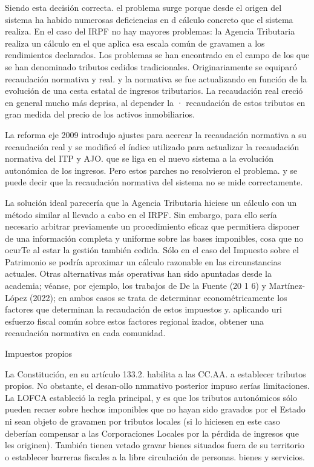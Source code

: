 \documentclass[10pt,a4paper]{article}
\begin{document}
{Siendo esta decisión correcta. el problema surge porque desde el origen del sistema ha habido numerosas deficiencias en d cálculo concreto que el sistema realiza. En el caso del IRPF no hay mayores problemas: la Agencia Tributaria realiza un cálculo en el que aplica esa escala común de gravamen a los rendimientos declarados. Los problemas se han encontrado en el campo de los que se han denominado tributos cedidos tradicionales. Originariamente se equiparó recaudación normativa y real. y la normativa se fue actualizando en función de la evolución de una cesta estatal de ingresos tributarios. La recaudación real creció en general mucho más deprisa, al depender la · recaudación de estos tributos en gran medida del precio de los activos inmobiliarios.

La reforma eje 2009 introdujo ajustes para acercar la recaudación normativa a su recaudación real y se modificó el índice utilizado para actualizar la recaudación normativa del ITP y AJO. que se liga en el nuevo sistema a la evolución autonómica de los ingresos. Pero estos parches no resolvieron el problema. y se puede decir que la recaudación normativa del sistema no se mide correctamente.

La solución ideal parecería que la Agencia Tributaria hiciese un cálculo con un método similar al llevado a cabo en el IRPF. Sin embargo, para ello sería necesario arbitrar previamente un procedimiento eficaz que permitiera disponer de una información completa y uniforme sobre las bases imponibles, cosa que no ocurTe al estar la gestión también cedida. Sólo en el caso del Impuesto sobre el Patrimonio se podría aproximar un cálculo razonable en las circunstancias actuales. Otras alternativas más operativas han sido apuntadas desde la academia; véanse, por ejemplo, los trabajos de De la Fuente (20 1 6) y Martínez-López (2022); en ambos casos se trata de determinar econométricamente los factores que determinan la recaudación de estos impuestos y. aplicando uri esfuerzo fiscal común sobre estos factores regional izados, obtener una recaudación normativa en cada comunidad.

Impuestos propios

La Constitución, en su artículo 133.2. habilita a las CC.AA. a establecer tributos propios. No obstante, el desan-ollo nmmativo posterior impuso serías limitaciones. La LOFCA estableció la regla principal, y es que los tributos autonómicos sólo pueden recaer sobre hechos imponibles que no hayan sido gravados por el Estado ni sean objeto de gravamen por tributos locales (si lo hiciesen en este caso deberían compensar a las Corporaciones Locales por la pérdida de ingresos que les originen). También tienen vetado gravar bienes situados fuera de su territorio o establecer barreras fiscales a la libre circulación de personas. bienes y servicios.

}
\end{document}
